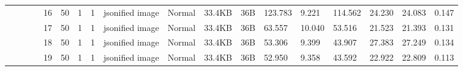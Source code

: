 \begin{landscape}
\begin{table}[]
{\begin{tabular}{@{}ccccllllllllllllll@{}}
                                                                                   &                              &                                &                                                                                                          & 16                                                    & 50                                       & 1                                          & 1                                 & jsonified image                  & Normal                             & 33.4KB                                        & 36B                                             & 123.783                 & 9.221    & 114.562                      & 24.230                  & 24.083   & 0.147                        \\
                                                                                   &                              &                                &                                                                                                          & 17                                                    & 50                                       & 1                                          & 1                                 & jsonified image                  & Normal                             & 33.4KB                                        & 36B                                             & 63.557                  & 10.040   & 53.516                       & 21.523                  & 21.393   & 0.131                        \\
                                                                                   &                              &                                &                                                                                                          & 18                                                    & 50                                       & 1                                          & 1                                 & jsonified image                  & Normal                             & 33.4KB                                        & 36B                                             & 53.306                  & 9.399    & 43.907                       & 27.383                  & 27.249   & 0.134                        \\
                                                                                   &                              &                                &                                                                                                          & 19                                                    & 50                                       & 1                                          & 1                                 & jsonified image                  & Normal                             & 33.4KB                                        & 36B                                             & 52.950                  & 9.358    & 43.592                       & 22.922                  & 22.809   & 0.113                        \\

\end{tabular}}
\end{table}
\end{landscape}
